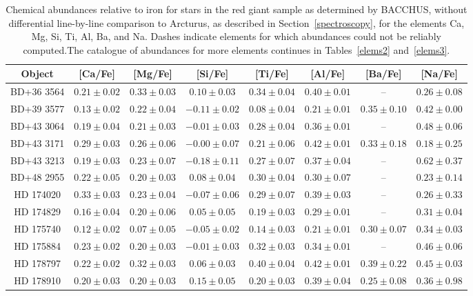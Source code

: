 \begin{table*}
\caption{Chemical abundances relative to iron for stars in the red giant sample as determined by BACCHUS, without differential line-by-line comparison to Arcturus, as described in Section~\ref{spectroscopy}, for the elements Ca, Mg, Si, Ti, Al, Ba, and Na. Dashes indicate elements for which abundances could not be reliably computed.The catalogue of abundances for more elements continues in Tables~\ref{elems2} and~\ref{elems3}.\label{elems1}}
\begin{tabular}{cccccccc}
\hline \hline
Object & [Ca/Fe] & [Mg/Fe] & [Si/Fe] & [Ti/Fe] & [Al/Fe] & [Ba/Fe] & [Na/Fe] \\
\hline
BD+36 3564 & $0.21 \pm 0.02$ & $0.33 \pm 0.03$ & $0.10 \pm 0.03$ & $0.34 \pm 0.04$ & $0.40 \pm 0.01$ & -- & $0.26 \pm 0.08$ \\
BD+39 3577 & $0.13 \pm 0.02$ & $0.22 \pm 0.04$ & $-0.11 \pm 0.02$ & $0.08 \pm 0.04$ & $0.21 \pm 0.01$ & $0.35 \pm 0.10$ & $0.42 \pm 0.00$ \\
BD+43 3064 & $0.19 \pm 0.04$ & $0.21 \pm 0.03$ & $-0.01 \pm 0.03$ & $0.28 \pm 0.04$ & $0.36 \pm 0.01$ & -- & $0.48 \pm 0.06$ \\
BD+43 3171 & $0.29 \pm 0.03$ & $0.26 \pm 0.06$ & $-0.00 \pm 0.07$ & $0.21 \pm 0.06$ & $0.42 \pm 0.01$ & $0.33 \pm 0.18$ & $0.18 \pm 0.25$ \\
BD+43 3213 & $0.19 \pm 0.03$ & $0.23 \pm 0.07$ & $-0.18 \pm 0.11$ & $0.27 \pm 0.07$ & $0.37 \pm 0.04$ & -- & $0.62 \pm 0.37$ \\
BD+48 2955 & $0.22 \pm 0.05$ & $0.20 \pm 0.03$ & $0.08 \pm 0.04$ & $0.30 \pm 0.04$ & $0.30 \pm 0.07$ & -- & $0.23 \pm 0.14$ \\
HD 174020 & $0.33 \pm 0.03$ & $0.23 \pm 0.04$ & $-0.07 \pm 0.06$ & $0.29 \pm 0.07$ & $0.39 \pm 0.03$ & -- & $0.26 \pm 0.33$ \\
HD 174829 & $0.16 \pm 0.04$ & $0.20 \pm 0.06$ & $0.05 \pm 0.05$ & $0.19 \pm 0.03$ & $0.29 \pm 0.01$ & -- & $0.31 \pm 0.04$ \\
HD 175740 & $0.12 \pm 0.02$ & $0.07 \pm 0.05$ & $-0.05 \pm 0.02$ & $0.14 \pm 0.03$ & $0.21 \pm 0.01$ & $0.30 \pm 0.07$ & $0.34 \pm 0.03$ \\
HD 175884 & $0.23 \pm 0.02$ & $0.20 \pm 0.03$ & $-0.01 \pm 0.03$ & $0.32 \pm 0.03$ & $0.34 \pm 0.01$ & -- & $0.46 \pm 0.06$ \\
HD 178797 & $0.22 \pm 0.02$ & $0.32 \pm 0.03$ & $0.06 \pm 0.03$ & $0.40 \pm 0.04$ & $0.42 \pm 0.01$ & $0.39 \pm 0.22$ & $0.45 \pm 0.03$ \\
HD 178910 & $0.20 \pm 0.03$ & $0.20 \pm 0.03$ & $0.15 \pm 0.05$ & $0.20 \pm 0.03$ & $0.39 \pm 0.04$ & $0.25 \pm 0.08$ & $0.36 \pm 0.98$ \\

\end{tabular}
\end{table*}
